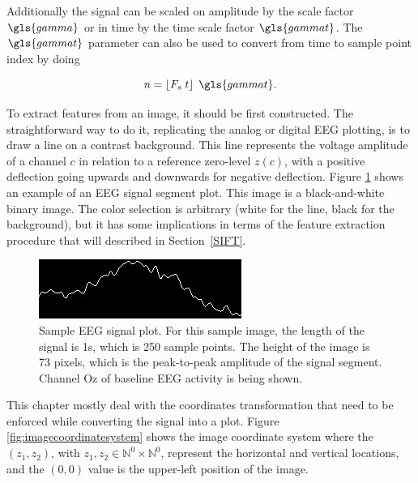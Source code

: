 Additionally the signal can be scaled on amplitude by the scale factor $\gls{gamma}$ or in time by the time scale factor $\gls{gammat}$.  The  $\gls{gammat}$ parameter can also be used to convert from time to sample point index by doing

\begin{equation}
n = \left\lfloor F_s \; t \right\rfloor \; \gls{gammat}  .
\label{eq:samplepointconversion}
\end{equation}

\vspace{3pt}

To extract features from an image, it should be first constructed.  The straightforward way to do it, replicating the analog or digital EEG plotting, is to draw a line on a contrast background.  This line represents the voltage amplitude of a channel $c$ in relation to a reference zero-level $z(c)$, with a positive deflection going upwards and downwards for negative deflection.  Figure \ref{fig:plottingsample} shows an example of an EEG signal segment plot.  This image is a black-and-white binary image.  The color selection is arbitrary (white for the line, black for the background), but it has some implications in terms of the feature extraction procedure that will described in Section~\ref{SIFT}.

\begin{figure}[]
\centering
\includegraphics[scale=1.5]{images/plottingsample.png}
\caption[EEG Signal Mapping to Images]{Sample EEG signal plot.  For this sample image, the length of the signal is 1s, which is 250 sample points.  The height of the image is 73 pixels, which is the peak-to-peak amplitude of the signal segment.  Channel Oz of baseline EEG activity is being shown.}
\label{fig:plottingsample}
\end{figure}

This chapter mostly deal with the coordinates transformation that need to be enforced while converting the signal into a plot.  Figure \ref{fig:imagecoordinatesystem} shows the image coordinate system where the $(z_1,z_2)$, with  $z_1,z_2 \in \mathbb{N}^0 \times \mathbb{N}^0$, represent the horizontal and vertical locations, and the $(0,0)$ value is the upper-left position of the image. 

